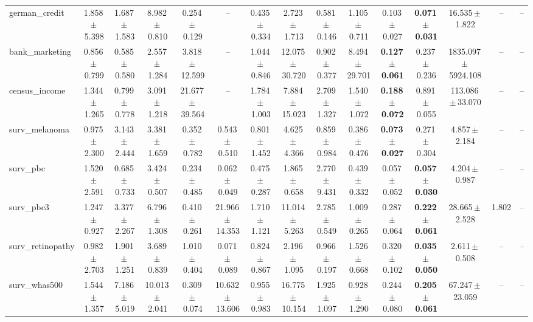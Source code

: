 \documentclass[8pt]{extarticle}
\begin{document}
\begin{longtable}{l*{14}{c}}
german\_credit & 1.858\,$\pm$\,5.398 & 1.687\,$\pm$\,1.583 & 8.982\,$\pm$\,0.810 & 0.254\,$\pm$\,0.129 & -- & 0.435\,$\pm$\,0.334 & 2.723\,$\pm$\,1.713 & 0.581\,$\pm$\,0.146 & 1.105\,$\pm$\,0.711 & 0.103\,$\pm$\,0.027 & \textbf{0.071\,$\pm$\,0.031} & 16.535\,$\pm$\,1.822 & -- & -- \\
bank\_marketing & 0.856\,$\pm$\,0.799 & 0.585\,$\pm$\,0.580 & 2.557\,$\pm$\,1.284 & 3.818\,$\pm$\,12.599 & -- & 1.044\,$\pm$\,0.846 & 12.075\,$\pm$\,30.720 & 0.902\,$\pm$\,0.377 & 8.494\,$\pm$\,29.701 & \textbf{0.127\,$\pm$\,0.061} & 0.237\,$\pm$\,0.236 & 1835.097\,$\pm$\,5924.108 & -- & -- \\
census\_income & 1.344\,$\pm$\,1.265 & 0.799\,$\pm$\,0.778 & 3.091\,$\pm$\,1.218 & 21.677\,$\pm$\,39.564 & -- & 1.784\,$\pm$\,1.003 & 7.884\,$\pm$\,15.023 & 2.709\,$\pm$\,1.327 & 1.540\,$\pm$\,1.072 & \textbf{0.188\,$\pm$\,0.072} & 0.891\,$\pm$\,0.055 & 113.086\,$\pm$\,33.070 & -- & -- \\
surv\_melanoma & 0.975\,$\pm$\,2.300 & 3.143\,$\pm$\,2.444 & 3.381\,$\pm$\,1.659 & 0.352\,$\pm$\,0.782 & 0.543\,$\pm$\,0.510 & 0.801\,$\pm$\,1.452 & 4.625\,$\pm$\,4.366 & 0.859\,$\pm$\,0.984 & 0.386\,$\pm$\,0.476 & \textbf{0.073\,$\pm$\,0.027} & 0.271\,$\pm$\,0.304 & 4.857\,$\pm$\,2.184 & -- & -- \\
surv\_pbc & 1.520\,$\pm$\,2.591 & 0.685\,$\pm$\,0.733 & 3.424\,$\pm$\,0.507 & 0.234\,$\pm$\,0.485 & 0.062\,$\pm$\,0.049 & 0.475\,$\pm$\,0.287 & 1.865\,$\pm$\,0.658 & 2.770\,$\pm$\,9.431 & 0.439\,$\pm$\,0.332 & 0.057\,$\pm$\,0.052 & \textbf{0.057\,$\pm$\,0.030} & 4.204\,$\pm$\,0.987 & -- & -- \\
surv\_pbc3 & 1.247\,$\pm$\,0.927 & 3.377\,$\pm$\,2.267 & 6.796\,$\pm$\,1.308 & 0.410\,$\pm$\,0.261 & 21.966\,$\pm$\,14.353 & 1.710\,$\pm$\,1.121 & 11.014\,$\pm$\,5.263 & 2.785\,$\pm$\,0.549 & 1.009\,$\pm$\,0.265 & 0.287\,$\pm$\,0.064 & \textbf{0.222\,$\pm$\,0.061} & 28.665\,$\pm$\,2.528 & 1.802 & -- \\
surv\_retinopathy & 0.982\,$\pm$\,2.703 & 1.901\,$\pm$\,1.251 & 3.689\,$\pm$\,0.839 & 1.010\,$\pm$\,0.404 & 0.071\,$\pm$\,0.089 & 0.824\,$\pm$\,0.867 & 2.196\,$\pm$\,1.095 & 0.966\,$\pm$\,0.197 & 1.526\,$\pm$\,0.668 & 0.320\,$\pm$\,0.102 & \textbf{0.035\,$\pm$\,0.050} & 2.611\,$\pm$\,0.508 & -- & -- \\
surv\_whas500 & 1.544\,$\pm$\,1.357 & 7.186\,$\pm$\,5.019 & 10.013\,$\pm$\,2.041 & 0.309\,$\pm$\,0.074 & 10.632\,$\pm$\,13.606 & 0.955\,$\pm$\,0.983 & 16.775\,$\pm$\,10.154 & 1.925\,$\pm$\,1.097 & 0.928\,$\pm$\,1.290 & 0.244\,$\pm$\,0.080 & \textbf{0.205\,$\pm$\,0.061} & 67.247\,$\pm$\,23.059 & -- & -- \\

\end{longtable}
\end{document}

